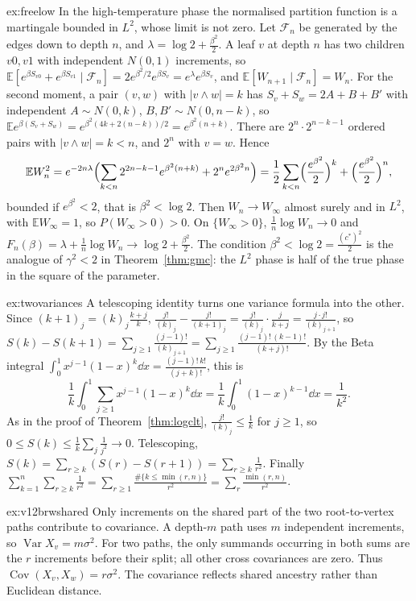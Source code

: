 \begin{solution}{ex:freelow}
\idea In the high-temperature phase the normalised partition function is a martingale bounded in $L^2$, whose limit is not zero.
\writeup Let $\mathcal F_n$ be generated by the edges down to depth $n$, and $\lambda=\log2+\frac{\beta^2}2$. A leaf $v$ at depth $n$ has two children $v0,v1$ with independent $N(0,1)$ increments, so
$\mathbb E[e^{\beta S_{v0}}+e^{\beta S_{v1}}\mid\mathcal F_n]=2e^{\beta^2/2}e^{\beta S_v}=e^\lambda e^{\beta S_v}$, and $\mathbb E[W_{n+1}\mid\mathcal F_n]=W_n$. For the second moment, a pair $(v,w)$ with $|v\wedge w|=k$ has $S_v+S_w=2A+B+B'$ with independent $A\sim N(0,k)$, $B,B'\sim N(0,n-k)$, so
$\mathbb Ee^{\beta(S_v+S_w)}=e^{\beta^2(4k+2(n-k))/2}=e^{\beta^2(n+k)}$. There are $2^n\cdot2^{n-k-1}$ ordered pairs with $|v\wedge w|=k<n$, and $2^n$ with $v=w$. Hence
\[
\mathbb EW_n^2=e^{-2n\lambda}\Bigl(\sum_{k<n}2^{2n-k-1}e^{\beta^2(n+k)}+2^ne^{2\beta^2n}\Bigr)=\frac12\sum_{k<n}\Bigl(\frac{e^{\beta^2}}2\Bigr)^k+\Bigl(\frac{e^{\beta^2}}2\Bigr)^n,
\]
bounded if $e^{\beta^2}<2$, that is $\beta^2<\log2$. Then $W_n\to W_\infty$ almost surely and in $L^2$, with $\mathbb EW_\infty=1$, so $P(W_\infty>0)>0$. On $\{W_\infty>0\}$, $\frac1n\log W_n\to0$ and $F_n(\beta)=\lambda+\frac1n\log W_n\to\log2+\frac{\beta^2}2$. The condition
$\beta^2<\log2=\frac{(c^*)^2}2$ is the analogue of $\gamma^2<2$ in Theorem~\ref{thm:gmc}: the $L^2$ phase is half of the true phase in the square of the parameter.
\end{solution}

\begin{solution}{ex:twovariances}
\idea A telescoping identity turns one variance formula into the other.
\writeup Since $(k+1)_j=(k)_j\frac{k+j}k$, $\frac{j!}{(k)_j}-\frac{j!}{(k+1)_j}=\frac{j!}{(k)_j}\cdot\frac j{k+j}=\frac{j\cdot j!}{(k)_{j+1}}$, so $S(k)-S(k+1)=\sum_{j\ge1}\frac{(j-1)!}{(k)_{j+1}}=\sum_{j\ge1}\frac{(j-1)!\,(k-1)!}{(k+j)!}$. By the Beta integral $\int_0^1x^{j-1}(1-x)^k\dd x=\frac{(j-1)!\,k!}{(j+k)!}$, this is
\[
\frac1k\int_0^1\sum_{j\ge1}x^{j-1}(1-x)^k\dd x=\frac1k\int_0^1(1-x)^{k-1}\dd x=\frac1{k^2}.
\]
As in the proof of Theorem~\ref{thm:logclt}, $\frac{j!}{(k)_j}\le\frac1k$ for $j\ge1$, so $0\le S(k)\le\frac1k\sum_j\frac1{j^2}\to0$. Telescoping, $S(k)=\sum_{r\ge k}(S(r)-S(r+1))=\sum_{r\ge k}\frac1{r^2}$. Finally $\sum_{k=1}^n\sum_{r\ge k}\frac1{r^2}=\sum_{r\ge1}\frac{\#\{k\le\min(r,n)\}}{r^2}=\sum_r\frac{\min(r,n)}{r^2}$.
\end{solution}

\begin{solution}{ex:v12brwshared}
\idea Only increments on the shared part of the two root-to-vertex paths contribute to covariance.
\writeup A depth-$m$ path uses $m$ independent increments, so $\operatorname{Var}X_v=m\sigma^2$. For two paths, the only summands occurring in both sums are the $r$ increments before their split; all other cross covariances are zero. Thus $\operatorname{Cov}(X_v,X_w)=r\sigma^2$. The covariance reflects shared ancestry rather than Euclidean distance.
\end{solution}


